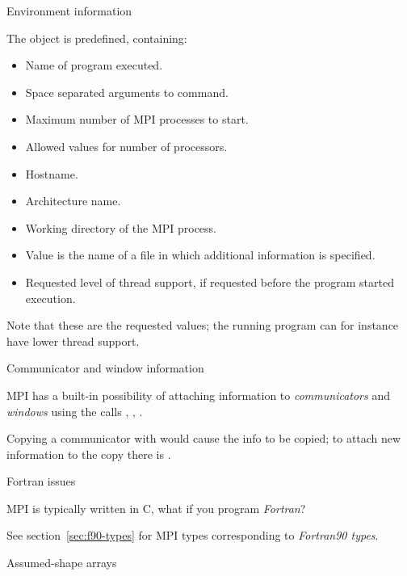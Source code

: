 
 {Environment information}
\label{sec:mpi-info-env}

The object  is predefined, containing:
\begin{itemize}
\item {}
  Name of program executed.
\item  {}
  Space separated arguments to command.
\item  {}
  Maximum number of MPI processes to start.
\item   {}
  Allowed values for number of processors.
\item   {}
  Hostname.
\item   {}
  Architecture name.
\item   {}
  Working directory of the MPI process.
\item   {}
  Value is the name of a file in which additional information is specified.
\item   {}
  Requested level of thread support, if requested before the program started execution.
\end{itemize}
Note that these are the requested values; the running program can for instance
have lower thread support.

 {Communicator and window information}

MPI has a built-in possibility of attaching information to
\emph{communicators}
and
\emph{windows}
using the calls
,
,
.

Copying a communicator with  would cause
the info to be copied; to attach new information to the copy there is
.

 {Fortran issues}
\label{sec:mpi-fortran}

MPI is typically written in C, what if you program \emph{Fortran}?

See section~\ref{sec:f90-types} for MPI types corresponding to
\emph{Fortran90 types}.

 {Assumed-shape arrays}

